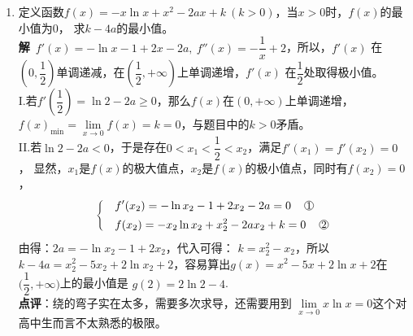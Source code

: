 \begin{enumerate}[label={【\textbf{例\thechapter.\arabic*}】},
 leftmargin=\inteval{\myenumleftmargin}pt,
 itemsep=\inteval{\myenumitempsep}pt,
 itemindent=\inteval{\myenumitemindent}pt]
\item 定义函数$ f(x)=-x\ln x+x^2-2ax+k \ (k>0) $，当$ x>0 $时，$ f(x) $的最小值为0，
求$ k-4a $的最小值。\\
\textbf{解}\ $ f'(x)=-\ln x-1+2x-2a,\ f''(x)=-\dfrac{1}{x}+2 $，所以，$ f'(x) $
在$ (0,\dfrac{1}{2}) $单调递减，在$ (\dfrac{1}{2},+\infty) $上单调递增，$ f'(x) $
在$ \dfrac{1}{2} $处取得极小值。\\
I.若$ f'(\dfrac{1}{2})=\ln2-2a\geq 0 $，那么$ f(x) $在$ (0,+\infty) $上单调递增，
$ f(x)_{\min}=\lim\limits_{x\to 0}f(x)=k=0 $，与题目中的$ k>0 $矛盾。\\
II.若$ \ln2-2a < 0 $，于是存在$ 0<x_1<\dfrac{1}{2}<x_2 $，满足$ f'(x_1)=f'(x_2)=0 $，
显然，$ x_1 $是$ f(x) $的极大值点，$ x_2 $是$ f(x) $的极小值点，同时有$ f(x_2)=0 $，
\begin{align*}
    \begin{dcases}
        & f'(x_2)=-\ln x_2-1+2x_2-2a=0  \quad\mycircled{1} \\
        & f(x_2)=-x_2\ln x_2+x_2^2-2ax_2+k=0 \quad\mycircled{2}
    \end{dcases}
\end{align*}
由得：$ 2a=-\ln x_2-1+2x_2 $，代入可得：
$ k=x_2^2-x_2 $，所以$ k-4a=x_2^2-5x_2+2\ln x_2+2 $，容易算出$ g(x)=x^2-5x+
2\ln x+2 $在$ \Big(\dfrac{1}{2},+\infty\Big) $上的最小值是
$ g(2)=2\ln 2-4 $. \\
\textbf{点评}：绕的弯子实在太多，需要多次求导，还需要用到
$ \lim\limits_{x\to 0} x\ln x=0 $这个对高中生而言不太熟悉的极限。\\

\end{enumerate}
\cleardoublepage

